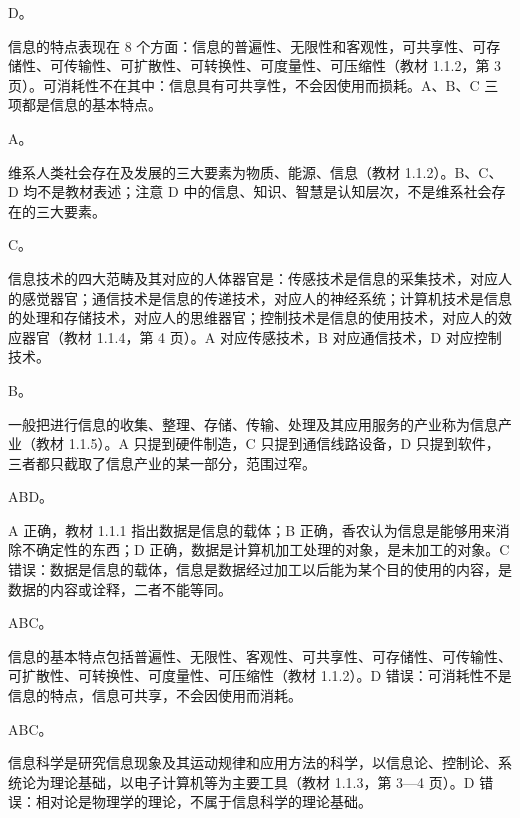 \documentclass[a4paper,11pt]{article}
\begin{document}
\q D。\begin{analysis}信息的特点表现在 8 个方面：信息的普遍性、无限性和客观性，可共享性、可存储性、可传输性、可扩散性、可转换性、可度量性、可压缩性（教材 1.1.2，第 3 页）。可消耗性不在其中：信息具有可共享性，不会因使用而损耗。A、B、C 三项都是信息的基本特点。\end{analysis}

\q A。\begin{analysis}维系人类社会存在及发展的三大要素为物质、能源、信息（教材 1.1.2）。B、C、D 均不是教材表述；注意 D 中的信息、知识、智慧是认知层次，不是维系社会存在的三大要素。\end{analysis}

\q C。\begin{analysis}信息技术的四大范畴及其对应的人体器官是：传感技术是信息的采集技术，对应人的感觉器官；通信技术是信息的传递技术，对应人的神经系统；计算机技术是信息的处理和存储技术，对应人的思维器官；控制技术是信息的使用技术，对应人的效应器官（教材 1.1.4，第 4 页）。A 对应传感技术，B 对应通信技术，D 对应控制技术。\end{analysis}

\q B。\begin{analysis}一般把进行信息的收集、整理、存储、传输、处理及其应用服务的产业称为信息产业（教材 1.1.5）。A 只提到硬件制造，C 只提到通信线路设备，D 只提到软件，三者都只截取了信息产业的某一部分，范围过窄。\end{analysis}


\q ABD。\begin{analysis}A 正确，教材 1.1.1 指出数据是信息的载体；B 正确，香农认为信息是能够用来消除不确定性的东西；D 正确，数据是计算机加工处理的对象，是未加工的对象。C 错误：数据是信息的载体，信息是数据经过加工以后能为某个目的使用的内容，是数据的内容或诠释，二者不能等同。\end{analysis}

\q ABC。\begin{analysis}信息的基本特点包括普遍性、无限性、客观性、可共享性、可存储性、可传输性、可扩散性、可转换性、可度量性、可压缩性（教材 1.1.2）。D 错误：可消耗性不是信息的特点，信息可共享，不会因使用而消耗。\end{analysis}

\q ABC。\begin{analysis}信息科学是研究信息现象及其运动规律和应用方法的科学，以信息论、控制论、系统论为理论基础，以电子计算机等为主要工具（教材 1.1.3，第 3—4 页）。D 错误：相对论是物理学的理论，不属于信息科学的理论基础。\end{analysis}
\end{document}
